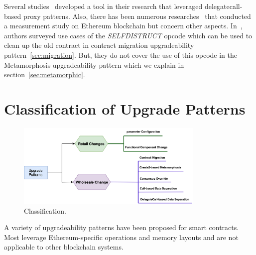 Several studies~\cite{rodler2021evmpatch,perez2022dissimilar} developed a tool in their research that leveraged delegatecall-based proxy patterns. Also, there has been numerous researches~\cite{perez2019broken,chen2017adaptive,reijsbergen2021transaction,victor2019measuring,pinna2019massive,he2020characterizing} that conducted a measurement study on Ethereum blockchain but concern other aspects. In~\cite{chen2021smart}, authors surveyed use cases of the \textit{SELFDISTRUCT} opcode which can be used to clean up the old contract in contract migration upgradeability pattern~\ref{sec:migration}. But, they do not cover the use of this opcode in the Metamorphosis upgradeability pattern which we explain in section~\ref{sec:metamorphic}.



\section{Classification of Upgrade Patterns} \label{sec:classification}

\begin{figure}[t]
  \centering
      \includegraphics[width=0.8\textwidth]{figures/New_Classification.png}
  \caption{Classification. \label{fig:class}}
 \end{figure}
 
A variety of upgradeability patterns have been proposed for smart contracts. Most leverage Ethereum-specific operations and memory layouts and are not applicable to other blockchain systems.



